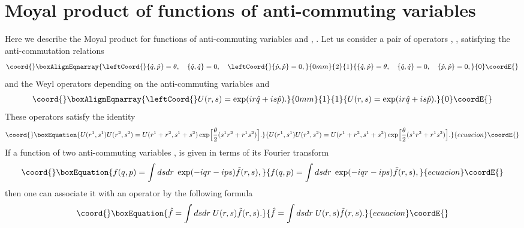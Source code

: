 \documentclass[a4paper,12pt]{article}
\begin{document}
\section{Moyal product of functions of anti-commuting variables}
\label{sec:mpfer}
\setcounter{equation}{0}

Here we describe the Moyal product for functions
of anti-commuting variables \coordHE{} and \coordHE{}, \coordHE{}.
Let us consider a pair of operators \coordHE{}, \coordHE{},
satisfying the anti-commutation relations
\begin{gather}\coord{}\boxAlignEqnarray{
\leftCoord{}\{\hat{q},\hat{p}\}=\theta,\quad \{\hat{q},\hat{q}\}=0, \quad
\leftCoord{}\{\hat{p},\hat{p}\}=0,
}{0mm}{2}{1}{
\{\hat{q},\hat{p}\}=\theta,\quad \{\hat{q},\hat{q}\}=0, \quad
\{\hat{p},\hat{p}\}=0,
}{0}\coordE{}\end{gather}
and the Weyl operators depending on the
anti-commuting variables \coordHE{} and \coordHE{}
\begin{gather}\coord{}\boxAlignEqnarray{
\leftCoord{}U(r,s)=\exp(ir\hat{q}+is\hat{p}).
}{0mm}{1}{1}{
U(r,s)=\exp(ir\hat{q}+is\hat{p}).
}{0}\coordE{}\end{gather}
These operators satisfy the identity
\begin{equation}\coord{}\boxEquation{
U(r^{1},s^{1})U(r^{2},s^{2}) =U(r^{1}+r^{2},s^{1}+s^{2})
\exp\Bigl[\frac{\theta}{2}(s^{1}r^{2}+r^{1}s^{2})\Bigr].
}{
U(r^{1},s^{1})U(r^{2},s^{2}) =U(r^{1}+r^{2},s^{1}+s^{2})
\exp\Bigl[\frac{\theta}{2}(s^{1}r^{2}+r^{1}s^{2})\Bigr].
}{ecuacion}\coordE{}\end{equation}
If a function \coordHE{} of two anti-commuting variables \coordHE{}, \coordHE{} is given
in terms of its Fourier transform
\begin{equation}\coord{}\boxEquation{
f(q,p)=\int dsdr\; \exp(-iqr-ips)\tilde{f}(r,s),
}{
f(q,p)=\int dsdr\; \exp(-iqr-ips)\tilde{f}(r,s),
}{ecuacion}\coordE{}\end{equation}
then one can associate it with an operator \coordHE{}  by the
following formula
\begin{equation}\coord{}\boxEquation{
\hat{f}=\int dsdr\; U(r,s)\tilde{f}(r,s).
}{
\hat{f}=\int dsdr\; U(r,s)\tilde{f}(r,s).
}{ecuacion}\coordE{}\end{equation}
\end{document}
